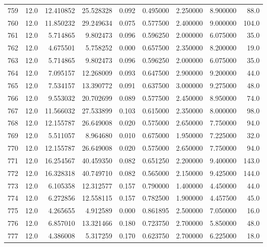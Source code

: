 \begin{tabular}{lrrrrrrrr}
759  &   12.0 &  12.410852 &  25.528328 &  0.092 &  0.495000 &  2.250000 &   8.900000 &   88.0 \\
760  &   12.0 &  11.850232 &  29.249634 &  0.075 &  0.577500 &  2.400000 &   9.000000 &  104.0 \\
761  &   12.0 &   5.714865 &   9.802473 &  0.096 &  0.596250 &  2.000000 &   6.075000 &   35.0 \\
762  &   12.0 &   4.675501 &   5.758252 &  0.000 &  0.657500 &  2.350000 &   8.200000 &   19.0 \\
763  &   12.0 &   5.714865 &   9.802473 &  0.096 &  0.596250 &  2.000000 &   6.075000 &   35.0 \\
764  &   12.0 &   7.095157 &  12.268009 &  0.093 &  0.647500 &  2.900000 &   9.200000 &   44.0 \\
765  &   12.0 &   7.534157 &  13.390772 &  0.091 &  0.637500 &  3.000000 &   9.275000 &   48.0 \\
766  &   12.0 &   9.553032 &  20.702699 &  0.089 &  0.577500 &  2.450000 &   8.950000 &   74.0 \\
767  &   12.0 &  11.566032 &  27.533899 &  0.103 &  0.615000 &  2.350000 &   8.000000 &   98.0 \\
768  &   12.0 &  12.155787 &  26.649008 &  0.020 &  0.575000 &  2.650000 &   7.750000 &   94.0 \\
769  &   12.0 &   5.511057 &   8.964680 &  0.010 &  0.675000 &  1.950000 &   7.225000 &   32.0 \\
770  &   12.0 &  12.155787 &  26.649008 &  0.020 &  0.575000 &  2.650000 &   7.750000 &   94.0 \\
771  &   12.0 &  16.254567 &  40.459350 &  0.082 &  0.651250 &  2.200000 &   9.400000 &  143.0 \\
772  &   12.0 &  16.328318 &  40.749710 &  0.082 &  0.565000 &  2.150000 &   9.425000 &  144.0 \\
773  &   12.0 &   6.105358 &  12.312577 &  0.157 &  0.790000 &  1.400000 &   4.450000 &   44.0 \\
774  &   12.0 &   6.272856 &  12.558115 &  0.157 &  0.782500 &  1.900000 &   4.457500 &   45.0 \\
775  &   12.0 &   4.265655 &   4.912589 &  0.000 &  0.861895 &  2.500000 &   7.050000 &   16.0 \\
776  &   12.0 &   6.857010 &  13.321466 &  0.180 &  0.723750 &  2.700000 &   5.850000 &   48.0 \\
777  &   12.0 &   4.386008 &   5.317259 &  0.170 &  0.623750 &  2.700000 &   6.225000 &   18.0 \\

\end{tabular}
